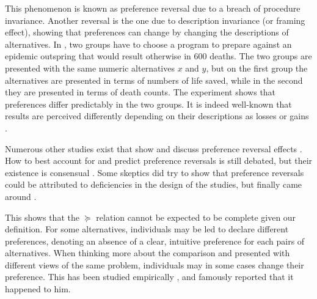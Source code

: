 \documentclass[french, english]{llncs}
\begin{document}
This phenomenon is known as preference reversal due to a breach of procedure invariance. Another reversal is the one due to description invariance (or framing effect), showing that preferences can change by changing the descriptions of alternatives. In \citet{tversky_framing_1981}, two groups have to choose a  program to prepare against an epidemic outspring that would result otherwise in 600 deaths. The two groups are presented with the same numeric alternatives $x$ and $y$, but on the first group the alternatives are presented in terms of numbers of life saved, while in the second they are presented in terms of death counts. The experiment shows that preferences differ predictably in the two groups. It is indeed well-known that results are perceived differently depending on their descriptions as losses or gains \citet{thaler_toward_1980}.

Numerous other studies exist that show and discuss preference reversal effects \citetext{\citealp[Ch. 2 (from which we took the two studies described here above)]{deparis_etude_2012}, \citealp{lichtenstein_construction_2006, tversky_causes_1990, kahneman_judgement_1981, kahneman_choices_2000}}. How to best account for and predict preference reversals is still debated, but their existence is consensual \citep{wakker_prospect_2010, birnbaum_empirical_2017}. Some skeptics did try to show that preference reversals could be attributed to deficiencies in the design of the studies, but finally came around \citep{slovic_preference_1983}.
	
This shows that the $\succeq$ relation cannot be expected to be complete given our definition. For some alternatives, individuals may be led to declare different preferences, denoting an absence of a clear, intuitive preference for each pairs of alternatives. When thinking more about the comparison and presented with different views of the same problem, individuals may in some cases change their preference. This has been studied empirically \citep{slovic_who_1974, maccrimmon_utility_1979, lichtenstein_reversals_2006}, and \citet[pp. 101–103]{savage_foundations_1972} famously reported that it happened to him.
\end{document}
